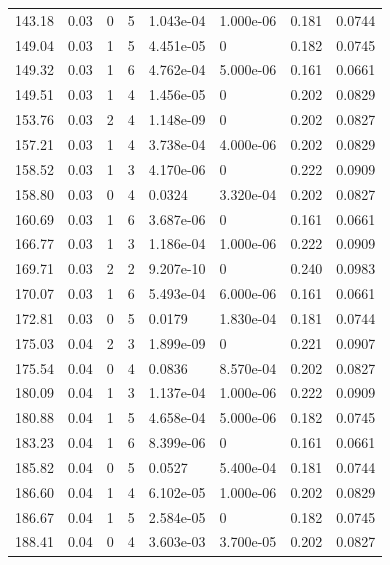 \documentclass[preview]{standalone}
\begin{document}
{{{\begin{tabular}{L{1.2cm}C{1.2cm} C{0.3cm}C{0.5cm} C{1.4cm}C{1.4cm} C{1.4cm}C{1.4cm}}
  143.18  &  0.03  & 0     &  5 &  1.043e-04  & 1.000e-06  & 0.181 &  0.0744   \\ 
  149.04  &  0.03  & 1     &  5 &  4.451e-05  & 0  & 0.182 &  0.0745   \\ 
  149.32  &  0.03  & 1     &  6 &  4.762e-04  & 5.000e-06  & 0.161 &  0.0661   \\ 
  149.51  &  0.03  & 1     &  4 &  1.456e-05  & 0  & 0.202 &  0.0829   \\ 
  153.76  &  0.03  & 2     &  4 &  1.148e-09  & 0  & 0.202 &  0.0827   \\ 
  157.21  &  0.03  & 1     &  4 &  3.738e-04  & 4.000e-06  & 0.202 &  0.0829   \\ 
  158.52  &  0.03  & 1     &  3 &  4.170e-06  & 0  & 0.222 &  0.0909   \\ 
  158.80  &  0.03  & 0     &  4 &  0.0324  & 3.320e-04  & 0.202 &  0.0827   \\ 
  160.69  &  0.03  & 1     &  6 &  3.687e-06  & 0  & 0.161 &  0.0661   \\ 
  166.77  &  0.03  & 1     &  3 &  1.186e-04  & 1.000e-06  & 0.222 &  0.0909   \\ 
  169.71  &  0.03  & 2     &  2 &  9.207e-10  & 0  & 0.240 &  0.0983   \\ 
  170.07  &  0.03  & 1     &  6 &  5.493e-04  & 6.000e-06  & 0.161 &  0.0661   \\ 
  172.81  &  0.03  & 0     &  5 &  0.0179  & 1.830e-04  & 0.181 &  0.0744   \\ 
  175.03  &  0.04  & 2     &  3 &  1.899e-09  & 0  & 0.221 &  0.0907   \\ 
  175.54  &  0.04  & 0     &  4 &  0.0836  & 8.570e-04  & 0.202 &  0.0827   \\ 
  180.09  &  0.04  & 1     &  3 &  1.137e-04  & 1.000e-06  & 0.222 &  0.0909   \\ 
  180.88  &  0.04  & 1     &  5 &  4.658e-04  & 5.000e-06  & 0.182 &  0.0745   \\ 
  183.23  &  0.04  & 1     &  6 &  8.399e-06  & 0  & 0.161 &  0.0661   \\ 
  185.82  &  0.04  & 0     &  5 &  0.0527  & 5.400e-04  & 0.181 &  0.0744   \\ 
  186.60  &  0.04  & 1     &  4 &  6.102e-05  & 1.000e-06  & 0.202 &  0.0829   \\ 
  186.67  &  0.04  & 1     &  5 &  2.584e-05  & 0  & 0.182 &  0.0745   \\ 
  188.41  &  0.04  & 0     &  4 &  3.603e-03  & 3.700e-05  & 0.202 &  0.0827   \\ 

\end{tabular}}}}
\end{document}
